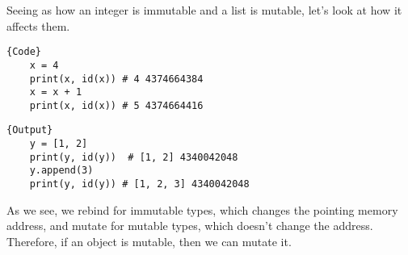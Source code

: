   Seeing as how an integer is immutable and a list is mutable, let's look at how it affects them. 

  \noindent\begin{minipage}{.5\textwidth}
  \begin{lstlisting}[]{Code}
    x = 4 
    print(x, id(x)) # 4 4374664384
    x = x + 1
    print(x, id(x)) # 5 4374664416
  \end{lstlisting}
  \end{minipage}
  \hfill
  \begin{minipage}{.49\textwidth}
  \begin{lstlisting}[]{Output}
    y = [1, 2]
    print(y, id(y))  # [1, 2] 4340042048
    y.append(3)
    print(y, id(y)) # [1, 2, 3] 4340042048
  \end{lstlisting}
  \end{minipage}

  As we see, we rebind for immutable types, which changes the pointing memory address, and mutate for mutable types, which doesn't change the address. Therefore, if an object is mutable, then we can mutate it. 

